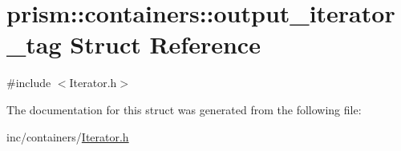 \hypertarget{structprism_1_1containers_1_1output__iterator__tag}{}\section{prism\+:\+:containers\+:\+:output\+\_\+iterator\+\_\+tag Struct Reference}
\label{structprism_1_1containers_1_1output__iterator__tag}


{\ttfamily \#include $<$Iterator.\+h$>$}



The documentation for this struct was generated from the following file\+:\begin{DoxyCompactItemize}
\item 
inc/containers/\hyperlink{_iterator_8h}{Iterator.\+h}\end{DoxyCompactItemize}
